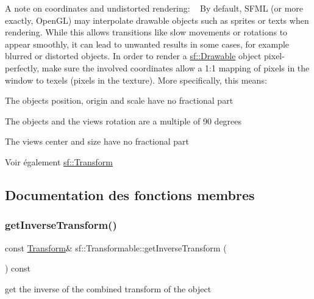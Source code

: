 A note on coordinates and undistorted rendering\+: ~\newline
By default, S\+F\+ML (or more exactly, Open\+GL) may interpolate drawable objects such as sprites or texts when rendering. While this allows transitions like slow movements or rotations to appear smoothly, it can lead to unwanted results in some cases, for example blurred or distorted objects. In order to render a \hyperlink{classsf_1_1Drawable}{sf\+::\+Drawable} object pixel-\/perfectly, make sure the involved coordinates allow a 1\+:1 mapping of pixels in the window to texels (pixels in the texture). More specifically, this means\+:
\begin{DoxyItemize}
\item The object\textquotesingle{}s position, origin and scale have no fractional part
\item The object\textquotesingle{}s and the view\textquotesingle{}s rotation are a multiple of 90 degrees
\item The view\textquotesingle{}s center and size have no fractional part
\end{DoxyItemize}

\begin{DoxySeeAlso}{Voir également}
\hyperlink{classsf_1_1Transform}{sf\+::\+Transform} 
\end{DoxySeeAlso}


\subsection{Documentation des fonctions membres}
\mbox{\label{classsf_1_1Transformable_ab18b25f51263252ff3811465eb7e9fb1}} 
\subsubsection{\texorpdfstring{get\+Inverse\+Transform()}{getInverseTransform()}}
{\footnotesize\ttfamily const \hyperlink{classsf_1_1Transform}{Transform}\& sf\+::\+Transformable\+::get\+Inverse\+Transform (\begin{DoxyParamCaption}{ }\end{DoxyParamCaption}) const}



get the inverse of the combined transform of the object 

